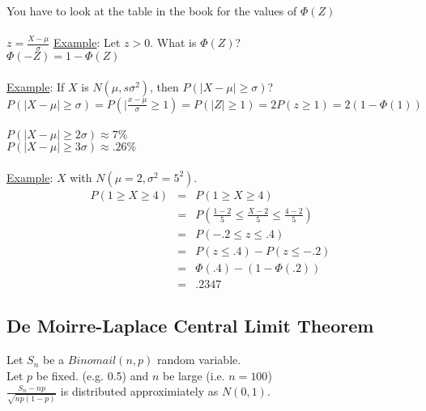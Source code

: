   You have to look at the table in the book for the values of $\Phi(Z)$\\\\
  $z = \frac{X - \mu}{\sigma}$
  \underline{Example}: Let $z > 0$. What is $\Phi(Z)$?\\
    $\Phi(-Z) = 1 - \Phi(Z)$\\\\
  \underline{Example}: If $X$ is $N(\mu, s\sigma^2)$, then $P(|X - \mu| \ge 
  \sigma)$?\\
  $P(|X - \mu| \ge \sigma) = P(|\frac{x - \mu}{\sigma} \ge 1) = P(|Z| \ge 1)
  = 2P(z \ge 1) = 2(1 - \Phi(1))$\\\\
  $P(|X - \mu| \ge 2\sigma) \approx 7\%$\\
  $P(|X - \mu| \ge 3\sigma) \approx .26\%$\\\\
  \underline{Example}:
    $X$ with $N(\mu = 2, \sigma^2 = 5^2)$.\\
    \begin{eqnarray*}
      P(1 \ge X \ge 4)  &=&  P(1 \ge X \ge 4)\\
      & = & P(\frac{1 - 2}{5} \le \frac{X-2}{5} \le \frac{4-2}{5})\\
      & = & P(-.2 \le z \le .4)\\
      & = & P(z \le .4) - P(z \le -.2)\\
      & = & \Phi(.4) - (1 - \Phi(.2)) \\
      & = & .2347
    \end{eqnarray*}

  \subsection*{De Moirre-Laplace Central Limit Theorem}
    Let $S_n$ be a $Binomail(n,p)$ random variable.\\
    Let $p$ be fixed. (e.g. 0.5) and $n$ be large (i.e. $n = 100$)\\
    $\frac{S_n - np}{\sqrt{np(1-p)}}$ is distributed approximiately as $N(0,1)$.

